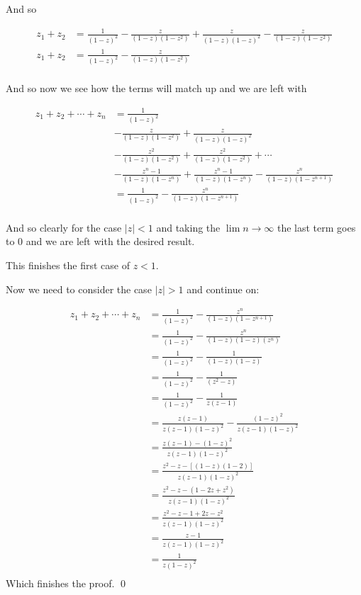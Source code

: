 \begin{enumerate}
	And so 

	\begin{align*}
		z_1 + z_2 &= \frac{1}{(1 - z)^2} - \frac{z}{(1 - z)(1 - z^{2})} + \frac{z}{(1 - z)(1 - z)^2} - \frac{z}{(1 - z)(1 - z^{2})} \\
		z_1 + z_2 &= \frac{1}{(1 - z)^2} - \frac{z}{(1 - z)(1 - z^{2})} \\
	\end{align*}

	And so now we see how the terms will match up and we are left with

	\begin{align*}
		z_1 + z_2 + \cdots + z_n &= \frac{1}{(1 - z)^2} \\
		&- \frac{z}{(1 - z)(1 - z^{2})} + \frac{z}{(1 - z)(1 - z)^2} \\
		&- \frac{z^2}{(1 - z)(1 - z^{2})} + \frac{z^2}{(1 - z)(1 - z^{2})} + \cdots \\
		&- \frac{z^n-1}{(1 - z)(1 - z^{n})} +\frac{z^n-1}{(1 - z)(1 - z^{n})} - \frac{z^n}{(1 - z)(1 - z^{n + 1})} \\
		&= \frac{1}{(1 - z)^2} - \frac{z^n}{(1 - z)(1 - z^{n + 1})} \\
	\end{align*}

	And so clearly for the case $|z| < 1$ and taking the $\lim n \to \infty$ the last term goes to $0$ and we are left 
	with the desired result.

	This finishes the first case of $z < 1$.

	Now we need to consider the case $|z| > 1$ and continue on:

		\begin{align*}
		z_1 + z_2 + \cdots + z_n &= \frac{1}{(1 - z)^2} - \frac{z^n}{(1 - z)(1 - z^{n + 1})} \\
		&= \frac{1}{(1 - z)^2} - \frac{z^n}{(1 - z)(1 - z)(z^n)} \\
		&= \frac{1}{(1 - z)^2} - \frac{1}{(1 - z)(1 - z)} \\
		&= \frac{1}{(1 - z)^2} - \frac{1}{(z^2 - z)} \\
		&= \frac{1}{(1 - z)^2} - \frac{1}{z(z - 1)} \\
		&= \frac{z(z - 1)}{z(z - 1)(1 - z)^2} - \frac{(1 - z)^2}{z(z - 1)(1 - z)^2} \\
		&= \frac{z(z - 1) - (1 - z)^2}{z(z - 1)(1 - z)^2} \\
		&= \frac{z^2 - z  - [(1 - z)(1 - 2)]}{z(z - 1)(1 - z)^2} \\
		&= \frac{z^2 - z  - (1 - 2z + z^2)}{z(z - 1)(1 - z)^2} \\
		&= \frac{z^2 - z  - 1 + 2z - z^2}{z(z - 1)(1 - z)^2} \\
		&= \frac{z - 1}{z(z - 1)(1 - z)^2} \\
		&= \frac{1}{z(1 - z)^2} \\
	\end{align*}
	Which finishes the proof.
	\qed

\end{enumerate}

